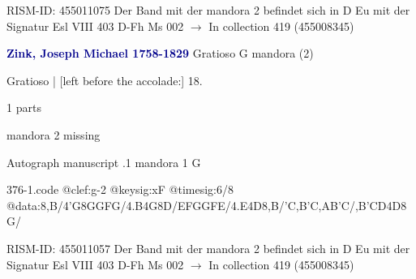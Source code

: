 \documentclass[twocolumn]{book}
\begin{document}
\newline RISM-ID: 455011075
\newline Der Band mit der mandora 2 befindet sich in D Eu mit der Signatur Esl VIII 403
\newline D-Fh  Ms 002
\newline $\rightarrow$ In collection 419 (455008345)

\newline \par \vspace{7pt} \textcolor{darkblue}{\textbf{Zink, Joseph Michael  1758-1829}}
\newline Gratioso  G  
\newline mandora (2)
\newline \begin{itshape}[f.13r, at left:] Gratioso | [left before the accolade:] 18.\end{itshape} 
\newline \textcolor{darkblue}{}  1 parts  
\newline \begin{small} mandora 2 missing\end{small} 
\newline Autograph manuscript
.1  mandora 1  G  
\begin{filecontents*}{376-1.code}
@clef:g-2
@keysig:xF
@timesig:6/8
@data:8,B/4'G8GGFG/4.B4G8D/{EF}GGFE/4.E4D8,B/'C,B'C,AB'C/{,B'C}D4D8G/
\end{filecontents*}
\newline
%

\newline RISM-ID: 455011057
\newline Der Band mit der mandora 2 befindet sich in D Eu mit der Signatur Esl VIII 403
\newline D-Fh  Ms 002
\newline $\rightarrow$ In collection 419 (455008345)
\end{document}
